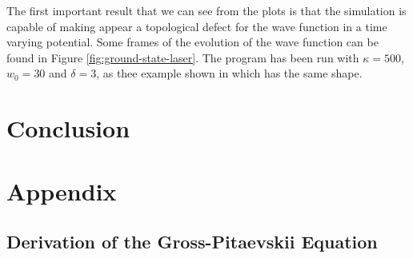 \documentclass{article}
\begin{document}
The first important result that we can see from the plots is that the simulation is capable of making appear a topological defect for the wave function in a time varying potential. Some frames of the evolution of the wave function can be found in Figure \ref{fig:ground-state-laser}. The program has been run with $\kappa = 500$, $w_0 = 30$ and $\delta = 3$, as thee example shown in \cite{Adams} which has the same shape.



\section{Conclusion}\label{sec:Conc}




\newpage
\section*{Appendix}\label{sec:Appendix}

\subsection*{Derivation of the Gross-Pitaevskii Equation}
\end{document}

